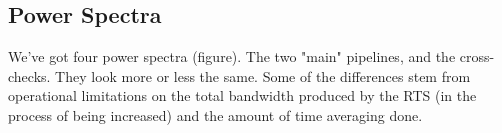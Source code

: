 \subsection{Power Spectra}
We've got four power spectra (figure). The two "main" pipelines, and the cross-checks. They look more or less the same. Some of the differences stem from operational limitations on the total bandwidth produced by the RTS (in the process of being increased) and the amount of time averaging done.  